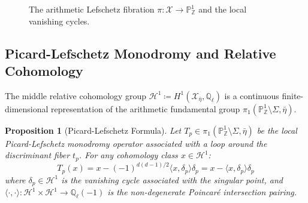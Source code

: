 \documentclass[11pt,a4paper]{article}
\newtheorem{proposition}[theorem]{Proposition}
\theoremstyle{definition}
\begin{document}
\begin{figure}[htbp]
\centering
{}
\caption{The arithmetic Lefschetz fibration $\pi : \mathcal{X} \to \mathbb{P}^1_{\mathbb{Z}}$ and the local vanishing cycles.}
\label{fig:lefschetz_fibration}
\end{figure}

\subsection{Picard-Lefschetz Monodromy and Relative Cohomology}
The middle relative cohomology group $\mathcal{H}^1 \coloneqq H^1(\mathcal{X}_{\bar{\eta}}, \mathbb{Q}_\ell)$ is a continuous finite-dimensional representation of the arithmetic fundamental group $\pi_1(\mathbb{P}^1_{\mathbb{Z}} \setminus \Sigma, \bar{\eta})$.

\begin{proposition}[Picard-Lefschetz Formula]\label{prop:picard_lefschetz}
Let $T_p \in \pi_1(\mathbb{P}^1_{\mathbb{Z}} \setminus \Sigma, \bar{\eta})$ be the local Picard-Lefschetz monodromy operator associated with a loop around the discriminant fiber $t_p$. For any cohomology class $x \in \mathcal{H}^1$:
\begin{equation}\label{eq:picard_lefschetz}
T_p(x) = x - (-1)^{d(d-1)/2} \langle x, \delta_p \rangle \delta_p = x - \langle x, \delta_p \rangle \delta_p
\end{equation}
where $\delta_p \in \mathcal{H}^1$ is the vanishing cycle associated with the singular point, and $\langle \cdot, \cdot \rangle : \mathcal{H}^1 \times \mathcal{H}^1 \to \mathbb{Q}_\ell(-1)$ is the non-degenerate Poincaré intersection pairing.
\end{proposition}
\end{document}
